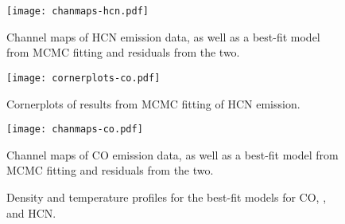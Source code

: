 \begin{figure}[htp]
  \hspace*{\fill}%
  \texttt{[image: chanmaps-hcn.pdf]}\hfill%
  \hspace*{\fill}%
  \caption{Channel maps of HCN emission data, as well as a best-fit model from MCMC fitting and residuals from the two.}
  \label{fig:hcn_chanmaps}
\end{figure}




\begin{figure}[htp]
  \hspace*{\fill}%
  \texttt{[image: cornerplots-co.pdf]}\hfill%
  \hspace*{\fill}%
  \caption{Cornerplots of results from MCMC fitting of HCN emission.}
  \label{fig:co_cornerplots}
\end{figure}


\begin{figure}[htp]
  \hspace*{\fill}%
  \texttt{[image: chanmaps-co.pdf]}\hfill%
  \hspace*{\fill}%
  \caption{Channel maps of CO emission data, as well as a best-fit model from MCMC fitting and residuals from the two.}
  \label{fig:co_chanmaps}
\end{figure}










\begin{figure}[htp]
  \centering
    \hspace*{\fill}%
    \vfill%
    \vfill%
    \hspace*{\fill}%
    \caption{Density and temperature profiles for the best-fit models for CO, \hco, and HCN.}
    \label{fig:bf_disk_strs}
\end{figure}

